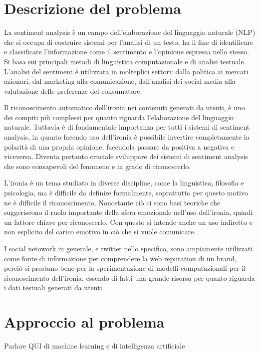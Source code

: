 \documentclass[oneside]{book}
\begin{document}
\section*{Descrizione del problema}

La sentiment analysis è un campo dell'elaborazione del linguaggio naturale (NLP) che si occupa di costruire sistemi per l'analisi di un testo, ha il fine di identificare e classificare l'informazione come il sentimento e l'opinione espressa nello stesso. Si basa sui principali metodi di linguistica computazionale e di analisi testuale. L'analisi del sentiment è utilizzata in molteplici settori: dalla politica ai mercati azionari, dal marketing alla comunicazione, dall'analisi dei social media alla valutazione delle preferenze del consumatore. 

Il riconoscimento automatico dell'ironia nei contenuti generati da utenti, è uno dei compiti più complessi per quanto riguarda l'elaborazione del linguaggio naturale. Tuttavia è di fondamentale importanza per tutti i sistemi di sentiment analysis, in quanto facendo uso dell'ironia è possibile invertire completamente la polarità di una propria opinione, facendola passare da positiva a negativa e viceversa.
Diventa pertanto cruciale sviluppare dei sistemi di sentiment analysis che sono consapevoli del fenomeno e in grado di riconoscerlo.

L'ironia è un tema studiato in diverse discipline, come la linguistica, filosofia e psicologia, ma è difficile da definire formalmente, soprattutto per questo motivo ne è difficile il riconoscimento. Nonostante ciò ci sono basi teoriche che suggeriscono il ruolo importante della sfera emozionale nell'uso dell'ironia, quindi un fattore chiave per riconoscerlo. Con questo si intende anche un uso indiretto e non esplicito del carico emotivo in ciò che si vuole comunicare.

I social netowork in generale, e twitter nello specifico, sono ampiamente utilizzati come fonte di informazione per comprendere la web reputation di un brand, perciò si prestano bene per la sperimentazione di modelli computazionali per il riconoscimento dell'ironia, essendo di fatti una grande risorsa per quanto riguarda i dati testuali generati da utenti.


\section*{Approccio al problema}
Parlare QUI di machine learning e di intelligenza artificiale
\end{document}
